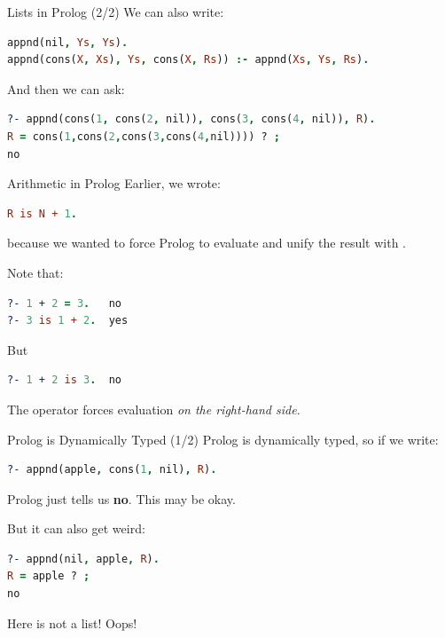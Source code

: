 \begin{frame}[fragile]{Lists in Prolog (2/2)}
We can also write:

\begin{lstlisting}[language=prolog, xleftmargin=0.5cm]
appnd(nil, Ys, Ys).
appnd(cons(X, Xs), Ys, cons(X, Rs)) :- appnd(Xs, Ys, Rs).
\end{lstlisting}

\pause

And then we can ask:

\begin{lstlisting}[language=prolog, xleftmargin=0.5cm]
?- appnd(cons(1, cons(2, nil)), cons(3, cons(4, nil)), R).
R = cons(1,cons(2,cons(3,cons(4,nil)))) ? ;
no
\end{lstlisting}
\end{frame}

\begin{frame}[fragile]{Arithmetic in Prolog}
Earlier, we wrote:

\begin{lstlisting}[language=prolog, xleftmargin=0.5cm]
R is N + 1.
\end{lstlisting}

because we wanted to force Prolog to evaluate  and unify the result with . 

Note that:

\begin{lstlisting}[language=prolog, xleftmargin=0.5cm]
?- 1 + 2 = 3.   no
?- 3 is 1 + 2.  yes
\end{lstlisting}

\pause

But

\begin{lstlisting}[language=prolog, xleftmargin=0.5cm]
?- 1 + 2 is 3.  no
\end{lstlisting}

The  operator forces evaluation \emph{on the right-hand side}.

\end{frame}

\begin{frame}[fragile]{Prolog is Dynamically Typed (1/2)}
Prolog is dynamically typed, so if we write:

\begin{lstlisting}[language=prolog, xleftmargin=0.5cm]
?- appnd(apple, cons(1, nil), R).
\end{lstlisting}

Prolog just tells us \textbf{no}. This may be okay.

\pause

But it can also get weird:

\begin{lstlisting}[language=prolog, xleftmargin=0.5cm]
?- appnd(nil, apple, R).
R = apple ? ;
no
\end{lstlisting}

Here  is not a list! Oops!
\end{frame}

